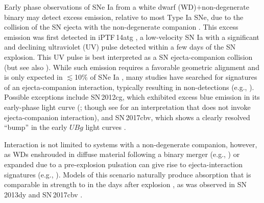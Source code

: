 \documentclass[twocolumn]{aastex61}
\newcommand{\ycao}[1]{{\color{red} ycao: {#1}}}
\begin{document}
Early phase observations of SNe Ia from a white dwarf (WD)$+$non-degenerate binary
may detect excess emission, relative to most Type Ia SNe, due to the 
collision of the SN ejecta with the non-degenerate companion 
\citep{1973ApJ...186.1007W,2010ApJ...708.1025K}. This excess 
emission was first detected in iPTF\,14atg  \citep{2015Natur.521..328C}, a low-velocity SN Ia with a significant and declining ultraviolet (UV) pulse detected within a
few days of the SN explosion. This UV pulse is best interpreted as a SN ejecta-companion collision (but see also \citealt{2016MNRAS.459.4428K,2017arXiv170603613N}). While such emission requires a 
favorable geometric alignment and is only expected in $\lesssim$10\% of SNe Ia \citep{2010ApJ...708.1025K}, many studies have 
searched for signatures of an ejecta-companion interaction, 
typically resulting in non-detections 
(e.g., \citealt{2010ApJ...722.1691H,2011ApJ...741...20B,2012ApJ...744...38F,
  2012ApJ...744L..17B,2015Natur.521..332O,
  2013ApJ...778L..15Z,2015ApJ...799..106G,2016ApJ...826..144S,
  2015ApJS..221...22I}). Possible exceptions include SN\,2012cg, 
which exhibited excess blue emission in its early-phase light curve 
(\citealt{2016ApJ...820...92M}; though see 
\citealt{2016arXiv161007601S} for an interpretation that does not 
invoke ejecta-companion interaction), and SN\,2017cbv, which shows a clearly resolved ``bump'' in the early $UBg$ light curves \citep{2017arXiv170608990H}. 

Interaction is not limited to systems with a non-degenerate companion, however, as WDs enshrouded in diffuse material following a binary merger (e.g., \citealt{2015MNRAS.447.2803L}) or expanded due to a pre-explosion pulsation can give rise to ejecta-interaction signatures (e.g., \citealt{2014MNRAS.441..532D}). Models of this scenario naturally produce  absorption that is comparable in strength to  in the days after explosion \citep{2014MNRAS.441..532D}, as was observed in SN\,2013dy \citep{2013ApJ...778L..15Z} and SN\,2017cbv \citep{2017arXiv170608990H}.
\end{document}
